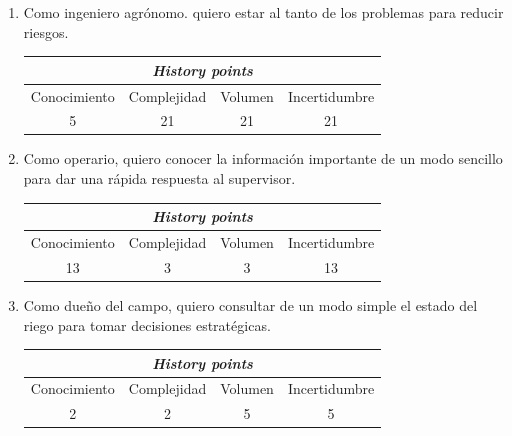 \documentclass[11pt]{charter}
\begin{document}
\begin{enumerate}
\clearpage

	\item Como ingeniero agrónomo. quiero estar al tanto de los problemas para reducir riesgos.
	\begin{table}[h]
		\begin{center}
			\begin{tabular}{|c|c|c|c|} \hline
				\multicolumn{4}{|c|}{\textbf{\textit{History points}}} \\\hline
  			Conocimiento & Complejidad & Volumen & Incertidumbre \\\hline
    			  5 	   &     21       &   21     &      21        \\\hline
			\end{tabular}
		\end{center}
	\end{table}


	\item Como operario, quiero conocer la información importante de un modo sencillo para dar una rápida respuesta al supervisor.
	\begin{table}[h]
		\begin{center}
			\begin{tabular}{|c|c|c|c|} \hline
				\multicolumn{4}{|c|}{\textbf{\textit{History points}}} \\\hline
  			Conocimiento & Complejidad & Volumen & Incertidumbre \\\hline
    			  13	   &     3       &   3     &      13        \\\hline
			\end{tabular}
		\end{center}
	\end{table}

	
	\item Como dueño del campo, quiero consultar de un modo simple el estado del riego para tomar decisiones estratégicas.
	\begin{table}[h]
		\begin{center}
			\begin{tabular}{|c|c|c|c|} \hline
				\multicolumn{4}{|c|}{\textbf{\textit{History points}}} \\\hline
  			Conocimiento & Complejidad & Volumen & Incertidumbre \\\hline
    			  2 	   &     2       &   5     &      5        \\\hline
			\end{tabular}
		\end{center}
	\end{table}


\end{enumerate}
\end{document}
